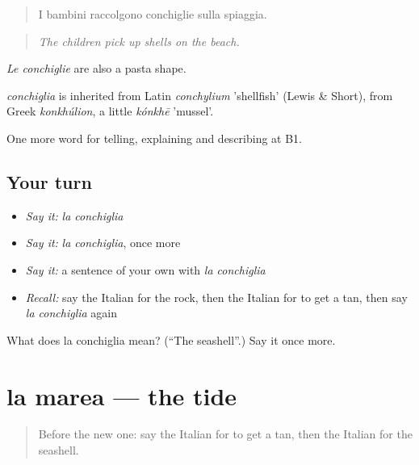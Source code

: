 \begin{quote}
I bambini raccolgono conchiglie sulla spiaggia.
\end{quote}

\begin{quote}
\emph{The children pick up shells on the beach.}
\end{quote}

\emph{Le conchiglie} are also a pasta shape.

\begin{cousinweb}
\emph{conchiglia} is inherited from Latin \emph{conchylium} 'shellfish' (Lewis \& Short), from Greek \emph{konkhúlion}, a little \emph{kónkhē} 'mussel'.
\end{cousinweb}

\begin{grammarlens}[title={What you've built}]
One more word for telling, explaining and describing at B1.
\end{grammarlens}

\subsection*{Your turn}
\begin{itemize}
\raggedright
  \item \emph{Say it:} \emph{la conchiglia}
  \item \emph{Say it:} \emph{la conchiglia}, once more
  \item \emph{Say it:} a sentence of your own with \emph{la conchiglia}
  \item \emph{Recall:} say the Italian for the rock, then the Italian for to get a tan, then say \emph{la conchiglia} again
\end{itemize}

\begin{tcolorbox}[breakable,colback=teal!4,colframe=teal!35!black,title={Before you move on}]
What does la conchiglia mean? (\textquotedblleft{}The seashell\textquotedblright{}.) Say it once more.
\end{tcolorbox}
\section[la marea]{la marea — the tide}

\label{lesson:IT-C463-marea}



\begin{quote}
Before the new one: say the Italian for to get a tan, then the Italian for the seashell.
\end{quote}

